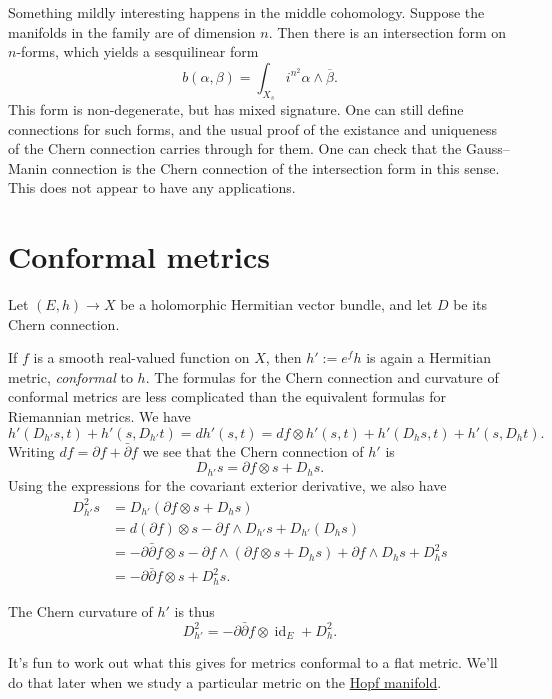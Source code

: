 \documentclass[11pt]{article}
\DeclareMathOperator{\id}{id}
\begin{document}
Something mildly interesting happens in the middle cohomology. Suppose the manifolds in the family are of dimension $n$. Then there is an intersection form on $n$-forms, which yields a sesquilinear form
$$
b(\alpha, \beta) = \int_{X_s} i^{n^2} \alpha \wedge \overline{\beta}.
$$
This form is non-degenerate, but has mixed signature. One can still define connections for such forms, and the usual proof of the existance and uniqueness of the Chern connection carries through for them. One can check that the Gauss--Manin connection is the Chern connection of the intersection form in this sense. This does not appear to have any applications.



\section{Conformal metrics}
\label{sec:org65fcbad}

Let \((E,h) \to X\) be a holomorphic Hermitian vector bundle, and let \(D\) be its Chern connection.

If \(f\) is a smooth real-valued function on \(X\), then \(h' := e^f h\) is again a Hermitian metric, \emph{conformal} to \(h\). The formulas for the Chern connection and curvature of conformal metrics are less complicated than the equivalent formulas for Riemannian metrics. We have
$$
h'(D_{h'} s, t) + h'(s, D_{h'} t)
= d h'(s, t)
= df \otimes h'(s, t) + h'(D_h s, t) + h'(s, D_h t).
$$
Writing \(df = \partial f + \bar\partial f\) we see that the Chern connection of \(h'\) is
$$
D_{h'} s = \partial f \otimes s + D_h s.
$$
Using the expressions for the covariant exterior derivative, we also have
\begin{align*}
D_{h'}^2 s
&= D_{h'}(\partial f \otimes s + D_h s)
\\
&= d(\partial f) \otimes s - \partial f \wedge D_{h'} s + D_{h'}(D_h s)
\\
&= -\partial\bar\partial f \otimes s - \partial f \wedge (\partial f \otimes s + D_h s) + \partial f \wedge D_h s + D_h^2 s
\\
&= -\partial\bar\partial f \otimes s + D_h^2 s.
\end{align*}

The Chern curvature of \(h'\) is thus
$$
D^2_{h'} = -\partial\bar\partial f \otimes \id_E + D^2_h.
$$

It's fun to work out what this gives for metrics conformal to a flat metric. We'll do that later when we study a particular metric on the \hyperref[sec:org8f5818e]{Hopf manifold}.
\end{document}
